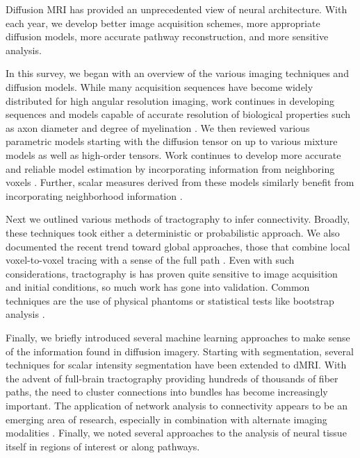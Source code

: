 \documentclass[final,hyperref]{gatech-thesis}
\begin{document}
Diffusion MRI has provided an unprecedented view of neural architecture.  With
each year, we develop better image acquisition schemes, more appropriate
diffusion models, more accurate pathway reconstruction, and more sensitive
analysis.

In this survey, we began with an overview of the various imaging techniques
and diffusion models.  While many acquisition sequences have become widely
distributed for high angular resolution imaging, work continues in developing
sequences and models capable of accurate resolution of biological properties
such as axon diameter and degree of myelination
\cite{Assaf2008,Alexander2009}.  We then reviewed various parametric models
starting with the diffusion tensor on up to various mixture models as well as
high-order tensors.  Work continues to develop more accurate and reliable
model estimation by incorporating information from neighboring voxels
\cite{Savadjiev2008,Malcolm2009ipmi}.  Further, scalar measures derived from
these models similarly benefit from incorporating neighborhood information
\cite{Savadjiev2009}.

Next we outlined various methods of tractography to infer connectivity.
Broadly, these techniques took either a deterministic or probabilistic
approach.  We also documented the recent trend toward global approaches, those
that combine local voxel-to-voxel tracing with a sense of the full path
\cite{Fillard2009,Reisert2009}.  Even with such considerations, tractography
is has proven quite sensitive to image acquisition and initial conditions, so
much work has gone into validation.  Common techniques are the use of physical
phantoms \cite{Poupon2008phantom} or statistical tests like bootstrap analysis
\cite{Lazar2005,Jones2005,Clayden2007}.

Finally, we briefly introduced several machine learning approaches to make
sense of the information found in diffusion imagery.  Starting with
segmentation, several techniques for scalar intensity segmentation have been
extended to dMRI.  With the advent of full-brain tractography providing
hundreds of thousands of fiber paths, the need to cluster connections into
bundles has become increasingly important.  The application of network
analysis to connectivity appears to be an emerging area of research,
especially in combination with alternate imaging modalities
\cite{Bullmore2009}.  Finally, we noted several approaches to the analysis of
neural tissue itself in regions of interest or along pathways.
\end{document}
